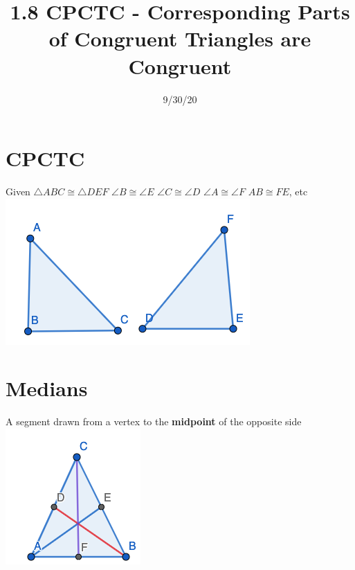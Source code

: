 \documentclass{article}
\begin{document}
	
	\setlength{\droptitle}{-5em}
	\title{1.8 CPCTC - Corresponding Parts of Congruent Triangles are Congruent}
	\date{9/30/20}
	\author{}
	\maketitle
	
	\section{CPCTC}
	
	Given $\triangle ABC \cong \triangle DEF $
	\newline 
	$\angle B \cong \angle E$
	\newline
	$\angle C \cong \angle D $
	\newline 
	$\angle A \cong \angle F$
	\newline \newline
	$AB \cong FE$, etc
	\newline
	\includegraphics[scale=0.45]{pics/CPCTCex.png}
	
	
	\section{Medians}
	A segment drawn from a vertex to the \textbf{midpoint} of the opposite side
	\newline
	\includegraphics[scale=0.45]{pics/medians.png}
	
\end{document}
